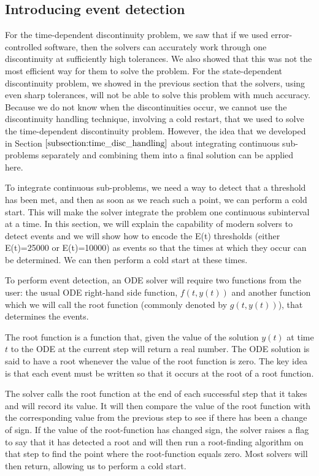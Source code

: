 \subsection{Introducing event detection}
\label{subsection:intro_event_detection}
For the time-dependent discontinuity problem, we saw that if we used error-controlled software, then the solvers can accurately work through one discontinuity at sufficiently high tolerances. We also showed that this was not the most efficient way for them to solve the problem. For the state-dependent discontinuity problem, we showed in the previous section that the solvers, using even sharp tolerances, will not be able to solve this problem with much accuracy. Because we do not know when the discontinuities occur, we cannot use the discontinuity handling technique, involving a cold restart, that we used to solve the time-dependent discontinuity problem. However, the idea that we developed in Section $\ref{subsection:time_disc_handling}$ about integrating continuous sub-problems separately and combining them into a final solution can be applied here. 

To integrate continuous sub-problems, we need a way to detect that a threshold has been met, and then as soon as we reach such a point, we can perform a cold start. This will make the solver integrate the problem one continuous subinterval at a time. In this section, we will explain the capability of modern solvers to detect events and we will show how to encode the E(t) thresholds (either E(t)=25000 or E(t)=10000) as events so that the times at which they occur can be determined. We can then perform a cold start at these times.

To perform event detection, an ODE solver will require two functions from the user: the usual ODE right-hand side function, $f(t, y(t))$ and another function which we will call the root function (commonly denoted by $g(t, y(t))$), that determines the events.

The root function is a function that, given the value of the solution $y(t)$ at time $t$ to the ODE at the current step will return a real number. The ODE solution is said to have a root whenever the value of the root function is zero. The key idea is that each event must be written so that it occurs at the root of a root function.

The solver calls the root function at the end of each successful step that it takes and will record its value. It will then compare the value of the root function with the corresponding value from the previous step to see if there has been a change of sign. If the value of the root-function has changed sign, the solver raises a flag to say that it has detected a root and will then run a root-finding algorithm on that step to find the point where the root-function equals zero. Most solvers will then return, allowing us to perform a cold start.

